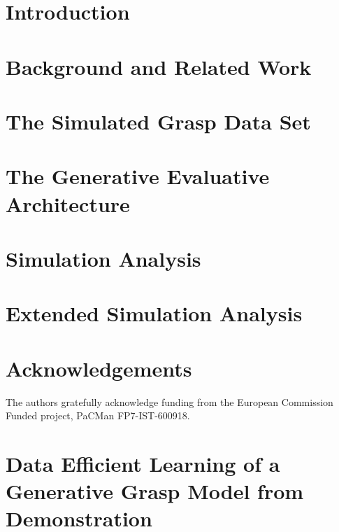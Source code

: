 \documentclass{ws-ijhr}
\begin{document}
\section{Introduction}



\section{Background and Related Work}



\section{The Simulated Grasp Data Set}
\label{section:simulation}


\section{The Generative Evaluative Architecture} \label{section:evaluative}



\section{Simulation Analysis}
\label{section:simulationAnalysis}


\section{Extended Simulation Analysis}
\label{section:extendedSimulationAnalysis}


\section*{Acknowledgements}

The authors gratefully acknowledge funding from the European Commission Funded project, PaCMan FP7-IST-600918.

\appendix

\section{Data Efficient Learning of a Generative Grasp Model from Demonstration}
\end{document}
